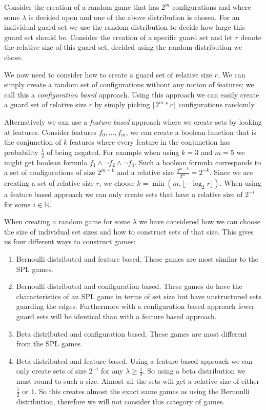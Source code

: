 Consider the creation of a random game that has $2^m$ configurations and where some $\lambda$ is decided upon and one of the above distribution is chosen. For an individual guard set we use the random distribution to decide how large this guard set should be. Consider the creation of a specific guard set and let $r$ denote the relative size of this guard set, decided using the random distribution we chose.

We now need to consider how to create a guard set of relative size $r$. We can simply create a random set of configurations without any notion of features; we call this a \textit{configuration based} approach. Using this approach we can easily create a guard set of relative size $r$ by simply picking $\lfloor 2^m*r\rfloor$ configurations randomly.

Alternatively we can use a \textit{feature based} approach where we create sets by looking at features. Consider features $f_0, \dots, f_m$, we can create a boolean function that is the conjunction of $k$ features where every feature in the conjunction has probability $\frac{1}{2}$ of being negated.  For example when using $k=3$ and $m=5$ we might get boolean formula $f_1 \wedge \neg f_2 \wedge \neg f_4$. Such a boolean formula corresponds to a set of configurations of size $2^{m-k}$ and a relative size $\frac{2^{m-k}}{2^m} = 2^{-k}$. Since we are creating a set of relative size $r$, we choose $k = \min(m, \lfloor -\log_2{r} \rfloor)$. When using a feature based approach we can only create sets that have a relative size of $2^{-i}$ for some $i \in \mathbb{N}$.

When creating a random game for some $\lambda$ we have considered how we can choose the size of individual set sizes and how to construct sets of that size. This gives us four different ways to construct games:
\begin{enumerate}
	\item Bernoulli distributed and feature based. These games are most similar to the SPL games.
	\item Bernoulli distributed and configuration based. These games do have the characteristics of an SPL game in terms of set size but have unstructured sets guarding the edges. Furthermore with a configuration based approach fewer guard sets will be identical than with a feature based approach.
	\item Beta distributed and configuration based. These games are most different from the SPL games.
	\item Beta distributed and feature based. Using a feature based approach we can only create sets of size $2^{-i}$ for any $\lambda \geq \frac{1}{2}$. So using a beta distribution we must round to such a size. Almost all the sets will get a relative size of either $\frac{1}{2}$ or $1$. So this creates almost the exact same games as using the Bernoulli distribution, therefore we will not consider this category of games.
\end{enumerate}

